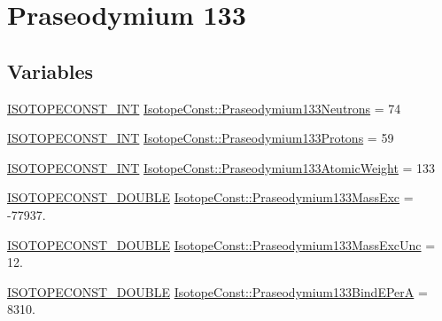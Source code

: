\hypertarget{group___isotope_const-_praseodymium-_pr133}{}\section{Praseodymium 133}
\label{group___isotope_const-_praseodymium-_pr133}
\subsection*{Variables}
\begin{DoxyCompactItemize}
\item 
\mbox{\hyperlink{group___isotope_const-_macros_ga5f18360b3e99483a35c32d789e62621c}{I\+S\+O\+T\+O\+P\+E\+C\+O\+N\+S\+T\+\_\+\+I\+NT}} \mbox{\hyperlink{group___isotope_const-_praseodymium-_pr133_gab3a1bc01a25465c7e8fcb1915b193b12}{Isotope\+Const\+::\+Praseodymium133\+Neutrons}} = 74
\item 
\mbox{\hyperlink{group___isotope_const-_macros_ga5f18360b3e99483a35c32d789e62621c}{I\+S\+O\+T\+O\+P\+E\+C\+O\+N\+S\+T\+\_\+\+I\+NT}} \mbox{\hyperlink{group___isotope_const-_praseodymium-_pr133_ga5b66a92f70c8268b764692cf5c92eb5e}{Isotope\+Const\+::\+Praseodymium133\+Protons}} = 59
\item 
\mbox{\hyperlink{group___isotope_const-_macros_ga5f18360b3e99483a35c32d789e62621c}{I\+S\+O\+T\+O\+P\+E\+C\+O\+N\+S\+T\+\_\+\+I\+NT}} \mbox{\hyperlink{group___isotope_const-_praseodymium-_pr133_gaaea3d297ee72ce7ef88822f1b24996fe}{Isotope\+Const\+::\+Praseodymium133\+Atomic\+Weight}} = 133
\item 
\mbox{\hyperlink{group___isotope_const-_macros_ga8f45a7272ce02c0b4c65c44636ed719a}{I\+S\+O\+T\+O\+P\+E\+C\+O\+N\+S\+T\+\_\+\+D\+O\+U\+B\+LE}} \mbox{\hyperlink{group___isotope_const-_praseodymium-_pr133_gaf2383e342598ada60058fa1045bdb982}{Isotope\+Const\+::\+Praseodymium133\+Mass\+Exc}} = -\/77937.
\item 
\mbox{\hyperlink{group___isotope_const-_macros_ga8f45a7272ce02c0b4c65c44636ed719a}{I\+S\+O\+T\+O\+P\+E\+C\+O\+N\+S\+T\+\_\+\+D\+O\+U\+B\+LE}} \mbox{\hyperlink{group___isotope_const-_praseodymium-_pr133_ga2a6bebbc076e66f1c41122835bb8dd7c}{Isotope\+Const\+::\+Praseodymium133\+Mass\+Exc\+Unc}} = 12.
\item 
\mbox{\hyperlink{group___isotope_const-_macros_ga8f45a7272ce02c0b4c65c44636ed719a}{I\+S\+O\+T\+O\+P\+E\+C\+O\+N\+S\+T\+\_\+\+D\+O\+U\+B\+LE}} \mbox{\hyperlink{group___isotope_const-_praseodymium-_pr133_ga821de70f8f91e3515345f0ead1835be4}{Isotope\+Const\+::\+Praseodymium133\+Bind\+E\+PerA}} = 8310.

\end{DoxyCompactItemize}
